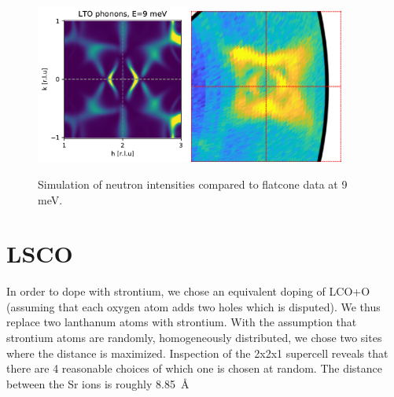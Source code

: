\begin{figure}
	\centering
	\includegraphics[width=0.45\textwidth]{fig/simulation/qxqy_neutron.pdf}
	\hspace{2em}
	\includegraphics[width=0.45\textwidth]{fig/simulation/flatcone_data.png}
	\caption[flatcone 9 meV compared to simulation]{Simulation of neutron intensities compared to flatcone data at 9 meV.}
	\label{fig:qxqy_neutron}
	
\end{figure}

\section{LSCO}

In order to dope with strontium, we chose an equivalent doping of LCO+O (assuming that each oxygen atom adds two holes which is disputed). We thus replace two lanthanum atoms with strontium. With the assumption that strontium atoms are randomly, homogeneously distributed, we chose two sites where the distance is maximized. Inspection of the 2x2x1 supercell reveals that there are 4 reasonable choices of which one is chosen at random. The distance between the Sr ions is roughly \SI{8.85}{\angstrom}




